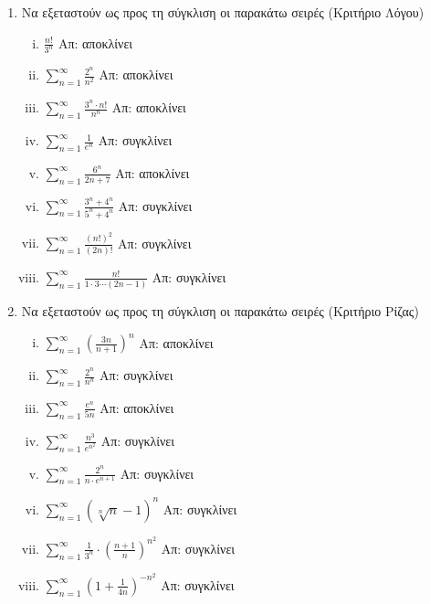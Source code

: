 \begin{enumerate}
    \item Να εξεταστούν ως προς τη σύγκλιση οι παρακάτω σειρές (Κριτήριο Λόγου)
        \begin{enumerate}[i)]
            \item $ \frac{n!}{3^{n}} $ \hfill Απ: αποκλίνει 
            \item $ \sum_{n=1}^{\infty} \frac{2^{n}}{n^{2}} $ \hfill Απ: αποκλίνει
            \item $ \sum_{n=1}^{\infty} \frac{3^{n}\cdot n!}{n^{n}} $ \hfill Απ: 
                αποκλίνει
            \item $ \sum_{n=1}^{\infty} \frac{1}{e^{n}} $ \hfill Απ: συγκλίνει 
            \item $ \sum_{n=1}^{\infty} \frac{6^{n}}{2n+7} $ \hfill Απ: αποκλίνει 
            \item $ \sum_{n=1}^{\infty} \frac{3^{n}+4^{n}}{5^{n}+4^{n}} $ \hfill Απ: 
                συγκλίνει
            \item $ \sum_{n=1}^{\infty} \frac{(n!)^{2}}{(2n)!} $ \hfill Απ: συγκλίνει
            \item $ \sum_{n=1}^{\infty} \frac{n!}{1\cdot 3 \cdots (2n-1)} $ \hfill Απ: 
                συγκλίνει

        \end{enumerate}
    \item Να εξεταστούν ως προς τη σύγκλιση οι παρακάτω σειρές (Κριτήριο Ρίζας)

        \begin{enumerate}[i)]
            \item $ \sum_{n=1}^{\infty} \left(\frac{3n}{n+1} \right)^{n} $ 
                \hfill Απ: αποκλίνει 
            \item $ \sum_{n=1}^{\infty} \frac{2^{n}}{n^{n}} $ \hfill Απ: συγκλίνει 
            \item $ \sum_{n=1}^{\infty} \frac{e^{n}}{5n} $ \hfill Απ: αποκλίνει 
            \item $ \sum_{n=1}^{\infty} \frac{n^{3}}{e^{n^{2}}} $ \hfill Απ: συγκλίνει 
            \item $ \sum_{n=1}^{\infty} \frac{2^{n}}{n\cdot e^{n+1}} $ \hfill Απ: 
                συγκλίνει
            \item $ \sum_{n=1}^{\infty} \left(\sqrt[n]{n} -1\right)^{n} $ 
                \hfill Απ: συγκλίνει 
            \item $ \sum_{n=1}^{\infty} \frac{1}{3^{n}} \cdot 
                \left(\frac{n+1}{n} \right)^{n^{2}} $ \hfill Απ: συγκλίνει 
            \item $ \sum_{n=1}^{\infty} \left(1+ \frac{1}{4n} \right)^{-n^{2}} $
                \hfill Απ: συγκλίνει 
        \end{enumerate}


\end{enumerate}
